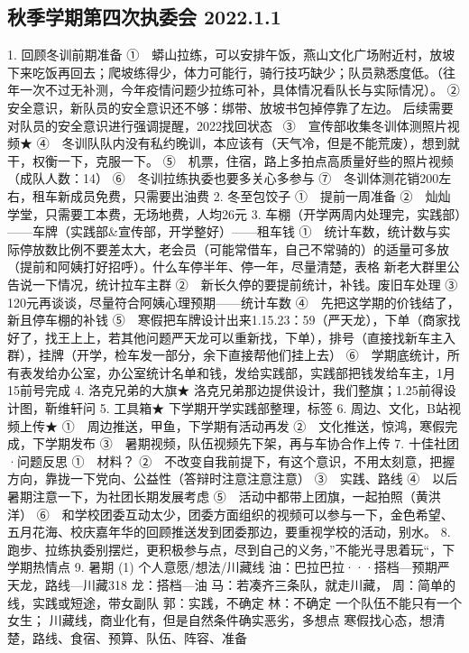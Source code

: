 \documentclass{ctexbook}
\begin{document}
\subsection{秋季学期第四次执委会 2022.1.1}
1.	回顾冬训前期准备
①　蟒山拉练，可以安排午饭，燕山文化广场附近村，放坡下来吃饭再回去；爬坡练得少，体力可能行，骑行技巧缺少；队员熟悉度低。（往年一次不过无补测，今年疫情问题少拉练可补，具体情况看队长与实际情况）。
②　安全意识，新队员的安全意识还不够：绑带、放坡书包掉停靠了左边。   
后续需要对队员的安全意识进行强调提醒，2022找回状态~
③　宣传部收集冬训体测照片视频★
④　冬训队队内没有私约晚训，本应该有（天气冷，但是不能荒废），想到就干，权衡一下，克服一下。
⑤　机票，住宿，路上多拍点高质量好些的照片视频（成队人数：14）
⑥　冬训拉练执委也要多关心多参与
⑦　冬训体测花销200左右，租车新成员免费，只需要出油费
2.	冬至包饺子
①　提前一周准备
②　灿灿学堂，只需要工本费，无场地费，人均26元
3.	车棚（开学两周内处理完，实践部）——车牌（实践部\&宣传部，开学整好）——租车钱
①　统计车数，统计数与实际停放数比例不要差太大，老会员（可能常借车，自己不常骑的）的适量可多放（提前和阿姨打好招呼）。什么车停半年、停一年，尽量清楚，表格
新老大群里公告说一下情况，统计拉车主群
②　新长久停的要提前统计，补钱。废旧车处理
③　120元再谈谈，尽量符合阿姨心理预期——统计车数
④　先把这学期的价钱结了，新且停车棚的补钱
⑤　寒假把车牌设计出来1.15.23：59（严天龙），下单（商家找好了，找王上上，若其他问题严天龙可以重新找，下单），排号（直接找新车主入群），挂牌（开学，检车发一部分，余下直接帮他们挂上去）
⑥　学期底统计，所有表发给办公室，办公室统计名单和钱，发给实践部，实践部把钱发给车主，1月15前号完成
4.	洛克兄弟的大旗★
洛克兄弟那边提供设计，我们整旗；1.25前得设计图，靳维轩问
5.	工具箱★
下学期开学实践部整理，标签
6.	周边、文化，B站视频上传★
①　周边推送，甲鱼，下学期有活动再发
②　文化推送，惊鸿，寒假完成，下学期发布
③　暑期视频，队伍视频先下架，再与车协合作上传
7.	十佳社团·问题反思
①　材料？
②　不改变自我前提下，有这个意识，不用太刻意，把握方向，靠拢一下党向、公益性（答辩时注意注意注意）
③　实践、路线
④　以后暑期注意一下，为社团长期发展考虑
⑤　活动中都带上团旗，一起拍照（黄洪洋）
⑥　和学校团委互动太少，团委方面组织的视频可以参与一下，金色希望、五月花海、校庆嘉年华的回顾推送发到团委那边，要重视学校的活动，别水。
8.	跑步、拉练执委别摆烂，更积极参与点，尽到自己的义务，''不能光寻思着玩``，下学期热情点
9.	暑期
(1)	个人意愿/想法/川藏线
油：巴拉巴拉···搭档—预期严天龙，路线—川藏318
龙：搭档—油
马：若凑齐三条队，就走川藏，
周：简单的线，实践或短途，带女副队
郭：实践，不确定
林：不确定
一个队伍不能只有一个女生；
川藏线，商业化有，但是自然条件确实恶劣，多想点
寒假找心态，想清楚，路线、食宿、预算、队伍、阵容、准备
\end{document}
